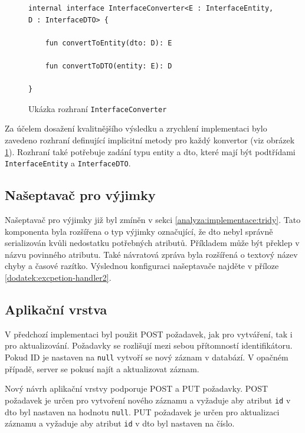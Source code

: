         
        \begin{figure} %
            \begin{verbatim}
internal interface InterfaceConverter<E : InterfaceEntity, D : InterfaceDTO> {

    fun convertToEntity(dto: D): E

    fun convertToDTO(entity: E): D

}
            \end{verbatim}
            \caption{Ukázka rozhraní \texttt{InterfaceConverter}} 
            \label{code:interface-converterl}
        \end{figure}
        Za účelem dosažení kvalitnějšího výsledku a zrychlení implementaci bylo zavedeno rozhraní definující implicitní metody pro každý konvertor (viz obrázek \ref{code:interface-converterl}). Rozhraní také potřebuje zadání typu entity a dto, které mají být podtřídami \verb|InterfaceEntity| a \verb|InterfaceDTO|. 
        
    \subsection{Našeptavač pro výjimky}
        Našeptavač pro výjimky již byl zmíněn v sekci \ref{analyza:implementace:tridy}. Tato komponenta byla rozšířena o typ výjimky označující, že dto nebyl správně serializován kvůli nedostatku potřebných atributů. Příkladem může být překlep v názvu povinného atributu. Také návratová zpráva byla rozšířená o textový název chyby a časové razítko. Výslednou konfiguraci našeptavače najděte v příloze \ref{dodatek:excpetion-handler2}.
        
    \subsection{Aplikační vrstva}
        V předchozí implementaci byl použit POST požadavek, jak pro vytváření, tak i pro aktualizování. Požadavky se rozlišují mezi sebou přítomností identifikátoru. Pokud ID je nastaven na \verb|null| vytvoří se nový záznam v databází. V opačném případě, server se pokusí najít a aktualizovat záznam.
        
        
        Nový návrh aplikační vrstvy podporuje POST a PUT požadavky. POST požadavek je určen pro vytvoření nového záznamu a vyžaduje aby atribut \verb|id| v dto byl nastaven na hodnotu \verb|null|. PUT požadavek je určen pro aktualizaci záznamu a vyžaduje aby atribut \verb|id| v dto byl nastaven na číslo.
        
